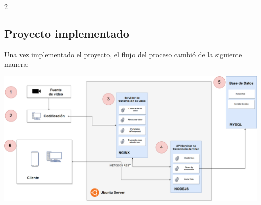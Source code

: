 \documentclass[12pt,spanish,Letterpaper,openany]{book}
\begin{document}
\begin {multicols}{2}
\hypertarget{proyecto-implementado}{%
\subsection{Proyecto implementado}\label{proyecto-implementado}}

Una vez implementado el proyecto, el flujo del proceso cambió de la siguiente manera:

\end {multicols}

\begin {flushleft}
\noindent\begin{minipage}[c]{\columnwidth}

\includegraphics[width=1\linewidth]{images/image02_bflorian1}

\end{minipage}

\end {flushleft}
\end{document}
